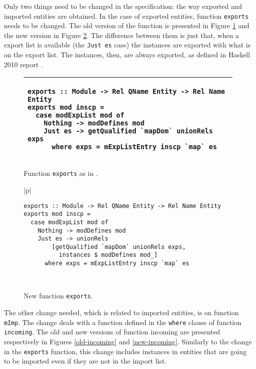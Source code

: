\documentclass[msc]{ppgccufmg}
\begin{document}
Only two things need to be changed in the specification: the way
exported and imported entities are obtained.  In the case of exported
entities, function \texttt{exports} \citep[section~5.2]{formal} needs
to be changed. The old version of the function is presented in Figure
\ref{old-exports} and the new version in Figure \ref{new-exports}.
The difference between them is just that, when a export list is
available (the \texttt{Just es} case) the instances are exported with
what is on the export list.  The instances, then, are always exported,
as defined in Haskell 2010 report \citep[section 5.4]{report}.

\begin{figure}
\caption{Function \texttt{exports} as in \citep[section 5.2]{formal}.\label{old-exports}}
\begin{tabular}{|p{\textwidth}|}
\hline
\begin{verbatim}
exports :: Module -> Rel QName Entity -> Rel Name Entity
exports mod inscp =
  case modExpList mod of
    Nothing -> modDefines mod
    Just es -> getQualified `mapDom` unionRels exps
      where exps = mExpListEntry inscp `map` es
\end{verbatim}
\\
\hline
\end{tabular}
\end{figure}

\begin{figure}
\caption{New function \texttt{exports}.\label{new-exports}}
\begin{tabular}{|p{\textwidth}|}
\hline
\begin{verbatim}
exports :: Module -> Rel QName Entity -> Rel Name Entity
exports mod inscp =
  case modExpList mod of
    Nothing -> modDefines mod
    Just es -> unionRels
        [getQualified `mapDom` unionRels exps,
          instances $ modDefines mod_]
      where exps = mExpListEntry inscp `map` es
\end{verbatim}
\\
\hline
\end{tabular}
\end{figure}

The other change needed, which is related to imported entities, is on
function \texttt{mImp}.  The change deals with a function defined in
the \texttt{where} clause of function \texttt{incoming}.  The old and
new versions of function incoming are presented respectively in
Figures \ref{old-incoming} and \ref{new-incoming}.  Similarly to the
change in the \texttt{exports} function, this change includes
instances in entities that are going to be imported even if they are
not in the import list.
\end{document}
